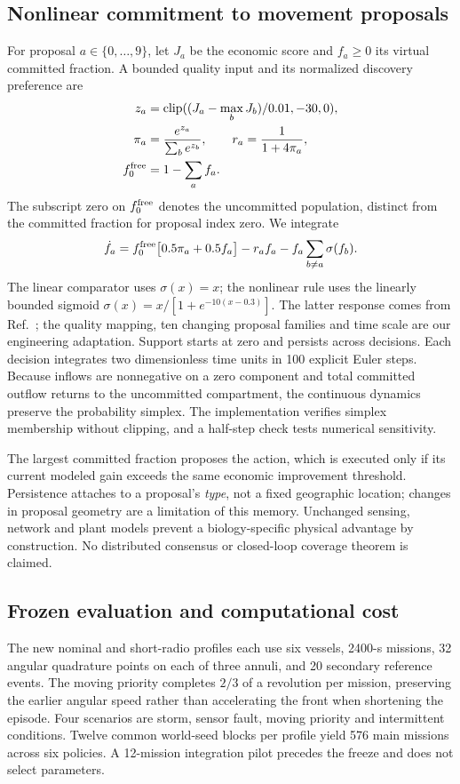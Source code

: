 \subsection{Nonlinear commitment to movement proposals}
For proposal $a\in\{0,\ldots,9\}$, let $J_a$ be the economic score and
$f_a\geq0$ its virtual committed fraction. A bounded quality input and its
normalized discovery preference are
\begin{align}
 z_a&=\operatorname{clip}((J_a-\max_bJ_b)/0.01,-30,0),\\
 \pi_a&=\frac{e^{z_a}}{\sum_b e^{z_b}},\qquad r_a=\frac{1}{1+4\pi_a},\\
 f_0^{\rm free}&=1-\sum_a f_a.
\end{align}
The subscript zero on $f_0^{\rm free}$ denotes the uncommitted population,
distinct from the committed fraction for proposal index zero. We integrate
\begin{equation}
 \dot f_a=f_0^{\rm free}\bigl[0.5\pi_a+0.5f_a\bigr]
 -r_af_a-f_a\sum_{b\ne a}\sigma(f_b).
\end{equation}
The linear comparator uses $\sigma(x)=x$; the nonlinear rule uses the
linearly bounded sigmoid $\sigma(x)=x/[1+e^{-10(x-0.3)}]$.
The latter response comes from Ref.~\cite{marchpons2025}; the quality mapping,
ten changing proposal families and time scale are our engineering adaptation.
Support starts at zero and persists across decisions. Each decision integrates
two dimensionless time units in 100 explicit Euler steps. Because inflows are
nonnegative on a zero component and total committed outflow returns to the
uncommitted compartment, the continuous dynamics preserve the probability
simplex. The implementation verifies simplex membership without clipping, and
a half-step check tests numerical sensitivity.

The largest committed fraction proposes the action, which is executed only if
its current modeled gain exceeds the same economic improvement threshold.
Persistence attaches to a proposal's \emph{type}, not a fixed geographic location;
changes in proposal geometry are a limitation of this memory. Unchanged sensing,
network and plant models prevent a biology-specific physical advantage by
construction. No distributed consensus or closed-loop coverage theorem is claimed.

\subsection{Frozen evaluation and computational cost}
The new nominal and short-radio profiles each use six vessels, 2400-s missions,
32 angular quadrature points on each of three annuli, and 20 secondary reference
events. The moving priority completes $2/3$ of a revolution per mission, preserving
the earlier angular speed rather than accelerating the front when shortening
the episode. Four scenarios are storm, sensor fault, moving priority and
intermittent conditions. Twelve common world-seed blocks per profile yield
576 main missions across six policies. A 12-mission integration pilot precedes
the freeze and does not select parameters.

